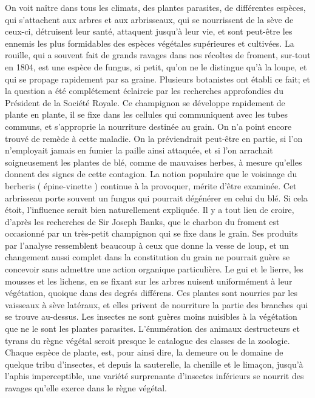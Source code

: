 On voit naître dans tous les climats, des plantes parasites, de différentes espèces, qui s'attachent aux arbres et aux arbrisseaux, qui se nourrissent de la sève de ceux-ci, détruisent leur santé, attaquent jusqu'à leur vie, et sont peut-être les ennemis les plus formidables des espèces végétales supérieures et cultivées.
La rouille, qui a souvent fait de grands ravages dans nos récoltes de froment, sur-tout en 1804, est une espèce de fungus, si petit, qu'on ne le distingue qu'à la loupe, et qui se propage rapidement par sa graine. Plusieurs botanistes ont établi ce fait; et la question a été complétement éclaircie par les recherches approfondies du Président de la Société Royale.
Ce champignon se développe rapidement de plante en plante, il se fixe dans les cellules qui communiquent avec les tubes communs,\setcounter{page}{137} et s'approprie la nourriture destinée au grain.
On n'a point encore trouvé de remède à cette maladie. On la préviendrait peut-être en partie, si l'on n'employait jamais en fumier la paille ainsi attaquée, et si l'on arrachait soigneusement les plantes de blé, comme de mauvaises herbes, à mesure qu'elles donnent des signes de cette contagion.
La notion populaire que le voisinage du berberis ( épine-vinette ) continue à la provoquer, mérite d'être examinée. Cet arbrisseau porte souvent un fungus qui pourrait dégénérer en celui du blé. Si cela étoit, l'influence serait bien naturellement expliquée.
Il y a tout lieu de croire, d'après les recherches de Sir Joseph Banks, que le charbon du froment est occasionné par un très-petit champignon qui se fixe dans le grain. Ses produits par l'analyse ressemblent beaucoup à ceux que donne la vesse de loup, et un changement aussi complet dans la constitution du grain ne pourrait guère se concevoir sans admettre une action organique particulière.
Le gui et le lierre, les mousses et les lichens, en se fixant sur les arbres nuisent\setcounter{page}{138} uniformément à leur végétation, quoique dans des degrés différens. Ces plantes sont nourries par les vaisseaux à sève latéraux, et elles privent de nourriture la partie des branches qui se trouve au-dessus.
Les insectes ne sont guères moins nuisibles à la végétation que ne le sont les plantes parasites.
L'énumération des animaux destructeurs et tyrans du règne végétal seroit presque le catalogue des classes de la zoologie. Chaque espèce de plante, est, pour ainsi dire, la demeure ou le domaine de quelque tribu d'insectes, et depuis la sauterelle, la chenille et le limaçon, jusqu'à l'aphis imperceptible, une variété surprenante d'insectes inférieurs se nourrit des ravages qu'elle exerce dans le règne végétal.
